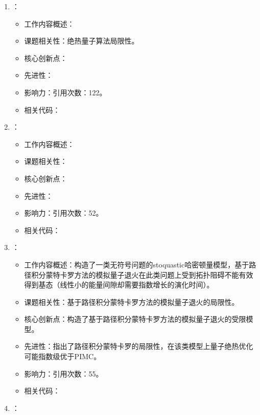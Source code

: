 \begin{enumerate}
\begin{itemize}
            \end{itemize}
            \item \citet{farhi2012performance}：
            \begin{itemize}
                \item 工作内容概述：
                \item 课题相关性：绝热量子算法局限性。
                \item 核心创新点：
                \item 先进性：
                \item 影响力：引用次数：122。
                \item 相关代码：
            \end{itemize}
            \item \citet{elgart2012note}：
            \begin{itemize}
                \item 工作内容概述：
                \item 课题相关性：
                \item 核心创新点：
                \item 先进性：
                \item 影响力：引用次数：52。
                \item 相关代码：
            \end{itemize}
            \item \citet{hastings2013obstructions}：
            \begin{itemize}
                \item 工作内容概述：构造了一类无符号问题的stoquastic哈密顿量模型，基于路径积分蒙特卡罗方法的模拟量子退火在此类问题上受到拓扑阻碍不能有效得到基态（线性小的能量间隙却需要指数增长的演化时间）。
                \item 课题相关性：基于路径积分蒙特卡罗方法的模拟量子退火的局限性。
                \item 核心创新点：构造了基于路径积分蒙特卡罗方法的模拟量子退火的受限模型。
                \item 先进性：指出了路径积分蒙特卡罗的局限性，在该类模型上量子绝热优化可能指数级优于PIMC。
                \item 影响力：引用次数：55。
                \item 相关代码：
            \end{itemize}
            \item \citet{boixo2014evidence}：
            \begin{itemize}

\end{itemize}
\end{enumerate}
